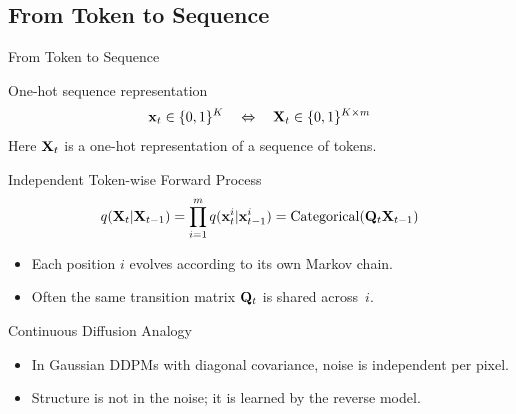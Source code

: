 \documentclass{beamer}
\renewcommand{\eqpause}{}
\begin{document}
\subsection{From Token to Sequence}
\begin{frame}{From Token to Sequence}
    \begin{block}{One-hot sequence representation}
        \vspace{-0.3cm}
        \[
            \mathbf{x}_t \in \{0,1\}^K
            \quad\Leftrightarrow\quad
            \mathbf{X}_t \in \{0,1\}^{K \times m}
        \]
        \vspace{-0.2cm}
        Here $\mathbf{X}_t$ is a one-hot representation of a sequence of tokens.
    \end{block}
    \eqpause
    \begin{block}{Independent Token-wise Forward Process}
        \vspace{-0.3cm}
        \[
            q(\mathbf{X}_t |\mathbf{X}_{t-1}) =
            \prod_{i=1}^m q(\mathbf{x}_t^i |\mathbf{x}_{t-1}^i) = \mathrm{Categorical}(\mathbf{Q}_t \mathbf{X}_{t-1})
        \]
        \vspace{-0.3cm}
        \begin{itemize}
            \item Each position $i$ evolves according to its own Markov chain.
            \item Often the same transition matrix $\mathbf{Q}_t$ is shared across~$i$.
        \end{itemize}
    \end{block}
    \eqpause
    \begin{block}{Continuous Diffusion Analogy}
        \begin{itemize}
            \item In Gaussian DDPMs with diagonal covariance, noise is independent per pixel.
            \item Structure is not in the noise; it is learned by the reverse model.
        \end{itemize}
    \end{block}
\end{frame}
\end{document}
